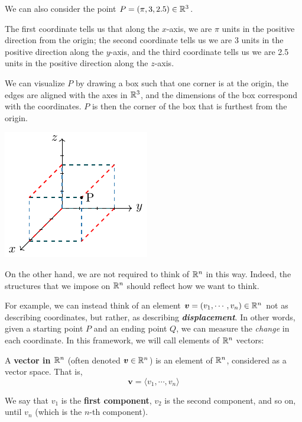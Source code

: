 \begin{example}
We can also consider the point $P = (\pi, 3, 2.5) \in \mathbb{R}^3$.  

The first coordinate tells us that along the $x$-axis, we are $\pi$ units in the positive direction from the origin; the second coordinate tells us we are 3 units in the positive direction along the $y$-axis, and the third coordinate tells us we are 2.5 units in the positive direction along the $z$-axis.

We can visualize $P$ by drawing a box such that one corner is at the origin, the edges are aligned with the axes in $\mathbb{R}^3$, and the dimensions of the box correspond with the coordinates.  $P$ is then the corner of the box that is furthest from the origin.

\begin{center}        
        \includegraphics{chapters/1-LinearAlgebra/figures/figures-cuber3.pdf}
    \end{center}
\end{example}


On the other hand, we are not required to think of $\mathbb{R}^n$ in this way.  Indeed, the structures that we impose on $\mathbb{R}^n$ should reflect how we want to think.

For example, we can instead think of an element $\bm{v} = (v_1, \cdots, v_n) \in \mathbb{R}^n$ not as describing coordinates, but rather, as describing \textit{\textbf{displacement}}.  In other words, given a starting point $P$ and an ending point $Q$, we can measure the \textit{change} in each coordinate.  In this framework, we will call elements of $\mathbb{R}^n$ vectors:

\begin{definition}
A \textbf{vector in $\mathbb{R}^n$} (often denoted $\bm{v} \in \mathbb{R}^n$) is an element of $\mathbb{R}^n$, considered as a vector space.  That is,
$$\bm{v} = \langle v_1, \cdots, v_n \rangle$$

We say that $v_1$ is the \textbf{first component}, $v_2$ is the second component, and so on, until $v_n$ (which is the $n$-th component).
\end{definition}



